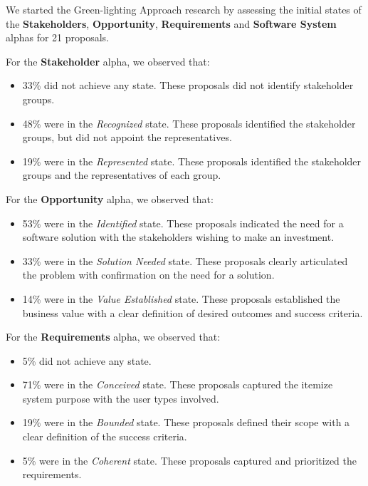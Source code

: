 \documentclass[conference]{IEEEtran}
\begin{document}
We started the Green-lighting Approach research by assessing the
initial states of the \textbf{Stakeholders}, \textbf{Opportunity},
\textbf{Requirements} and \textbf{Software System} alphas for 21 proposals.

For the \textbf{Stakeholder} alpha, we observed that:
\begin{itemize}
\itemsep1pt\parskip0pt
\item
  33\% did not achieve any state. These proposals did not identify
  stakeholder groups.
\item
  48\% were in the \textit{Recognized} state. These proposals identified the
  stakeholder groups, but did not appoint the representatives.
\item
  19\% were in the \textit{Represented} state. These proposals
  identified the stakeholder groups and the representatives of each
  group.
\end{itemize}

For the \textbf{Opportunity} alpha, we observed that:
\begin{itemize}
\itemsep1pt\parskip0pt
\item
  53\% were in the \textit{Identified} state. These proposals indicated the
  need for a software solution with the stakeholders wishing to make an
  investment.
\item
  33\% were in the \textit{Solution Needed} state. These proposals clearly
  articulated the problem with confirmation on the need for a solution.
\item
  14\% were in the \textit{Value Established} state. These proposals
  established the business value with a clear definition of desired
  outcomes and success criteria.
\end{itemize}

For the \textbf{Requirements} alpha, we observed that:
\begin{itemize}
\itemsep1pt\parskip0pt
\item
  5\% did not achieve any state.
\item
  71\% were in the \textit{Conceived} state. These proposals captured the 
  itemize system purpose with the user types involved.
\item
  19\% were in the \textit{Bounded} state. These proposals defined their 
  scope with a clear definition of the success criteria.
\item
  5\% were in the \textit{Coherent} state. These proposals captured and
  prioritized the requirements.
\end{itemize}
\end{document}

